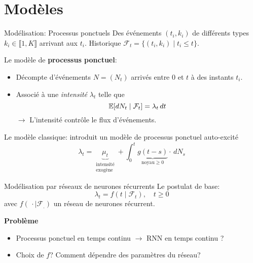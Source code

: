 \documentclass[../main.tex]{subfiles}
\begin{document}
\section{Modèles}

\begin{frame}{Modélisation: Processus ponctuels}
Des événements $(t_i, k_i)$ de différents types $k_i\in\llbracket 1, K\rrbracket$ arrivant aux $t_i$. Historique $\mathcal{F}_t = \{(t_i, k_i)\mid t_i \leq t\}$.\pause

Le modèle de \textbf{processus ponctuel}:
\begin{itemize}
	\item[\textbullet] Décompte d'événements $N = (N_t)$ arrivés entre $0$ et $t$ à des instants $t_i$.
	\item[\textbullet] Associé à une \textit{intensité} $\lambda_t$ telle que
	\[
	\mathbb{E}[dN_t\mid \mathcal{F}_t] = \lambda_t\,dt
	\]\pause
	$\rightarrow$ L'intensité contrôle le flux d'événements.
\end{itemize}

\end{frame}

\begin{frame}{Le modèle classique: \parencite{hawkes1971}}
\citeauthor{hawkes1971} introduit un modèle de processus ponctuel auto-excité
\begin{equation}
	\lambda_t =
	\underbrace{\mu_t}_{\substack{\text{intensité}\\\text{exogène}}} + \int_0^t \underbrace{g(t-s)}_{\text{noyau}\geq 0}\cdot\, dN_s
\end{equation}
\end{frame}


\begin{frame}{Modélisation par réseaux de neurones récurrents}
Le postulat de base:
\begin{equation}
	\lambda_t = f(t\mid \mathcal{F}_t),\quad t \geq 0
\end{equation}
avec $f(\,\cdot \mid \mathcal{F_{.}})$ un réseau de neurones récurrent.\pause

\noindent\textbf{Problème} \begin{itemize}
\item Processus ponctuel en temps continu $\rightarrow$ RNN en temps continu ?
\item Choix de $f$? Comment dépendre des paramètres du réseau?
\end{itemize}

\end{frame}
\end{document}
